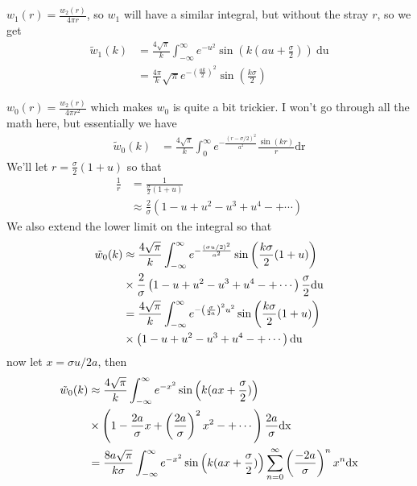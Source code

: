\documentclass[letterpaper,twocolumn,amsmath,amssymb,prb]{revtex4-1}
\begin{document}
$w_1(r) = \frac{w_2(r)}{4\pi r}$, so $w_1$ will have a similar
integral, but without the stray $r$, so we get
\begin{align}
  \tilde{w}_1(k)&= \frac{4\sqrt{\pi}}{k} \int_{-\infty}^\infty e^{-u^2} \sin\left(k\left(au +
  \frac{\sigma}{2}\right)\right) ~\textrm{du} \\
  &= \frac{4\pi}{k}\sqrt{\pi}e^{-\left(\frac{ak}{2} \right)^2} \sin\left(\frac{k\sigma}{2}\right)
\end{align}

$w_0(r) = \frac{w_2(r)}{4\pi r^2}$ which makes $w_0$ is quite a bit
trickier.  I won't go through all the math here, but essentially we
have
\begin{align}
  \tilde{w}_0(k) &= \frac{4\sqrt{\pi}}{k}\int_0^\infty
  e^{-\frac{(r-\sigma/2)^2}{a^2}} \frac{\sin(kr)}{r}\textrm{dr}
\end{align}
We'll let $r = \frac{\sigma}{2}(1 + u) $ so that
\begin{align}
  \frac{1}{r} &= \frac{1}{\frac{\sigma}{2}(1 + u)} \\
  &\approx \frac{2}{\sigma}\left(1 - u + u^2 - u^3 + u^4 -+\cdots \right)
\end{align}
We also extend the lower limit on the integral so that
\begin{align}
  \tilde{w}_0(k) &\approx \frac{4\sqrt{\pi}}{k}\int_{-\infty}^\infty
  e^{-\frac{(\sigma u/2)^2}{a^2}} \sin{\left( \frac{k\sigma}{2}(1+u)
    \right)} \notag\\
  &\times \frac{2}{\sigma} \left(1 - u + u^2 - u^3 + u^4 -+\cdots
  \right) \frac{\sigma}{2}\textrm{du} \\
  &= \frac{4\sqrt{\pi}}{k}\int_{-\infty}^\infty
  e^{-\left(\frac{\sigma}{2a} \right)^2 u^2} \sin{\left( \frac{k\sigma}{2}(1+u)
    \right)} \notag\\
  &\times \left(1 - u + u^2 - u^3 + u^4 -+\cdots \right) \textrm{du}
\end{align}
now let $x = \sigma u /2a$, then
\begin{align}
  \tilde{w}_0(k) &\approx \frac{4\sqrt{\pi}}{k}\int_{-\infty}^\infty
  e^{-x^2} \sin\left(k(ax+\frac{\sigma}{2})\right) \notag\\
  &\times \left(1 - \frac{2a}{\sigma}x +
  \left(\frac{2a}{\sigma}\right)^2 x^2 -+\cdots \right) \frac{2a}{\sigma}\textrm{dx} \\
  &= \frac{8a\sqrt{\pi}}{k\sigma}\int_{-\infty}^\infty
  e^{-x^2} \sin\left(k(ax+\frac{\sigma}{2})\right)
  \sum_{n=0}^{\infty} \left(\frac{-2a}{\sigma}\right)^n x^n \textrm{dx}
\end{align}
\end{document}
